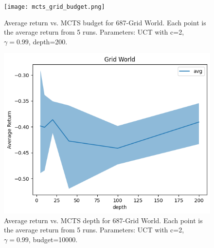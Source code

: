 \documentclass{article}
\begin{document}
\begin{figure}[!hb]
    \centering
    \begin{minipage}{0.48\textwidth}
        \centering
        \texttt{[image: mcts\_grid\_budget.png]}
        \caption{Average return vs. MCTS budget for 687-Grid World. Each point is the average return from 5 runs. Parameters: UCT with c=2, $\gamma=0.99$, depth=200.}
        \label{fig:4.1.1}
    \end{minipage}
    \hfill
    \begin{minipage}{0.48\textwidth}
        \centering
        \includegraphics[width=\linewidth]{mcts_grid_depth.png}
        \caption{ Average return vs. MCTS depth for 687-Grid World. Each point is the average return from 5 runs. Parameters: UCT with c=2, $\gamma=0.99$, budget=10000.}
        \label{fig:4.1.2}
    \end{minipage}
\end{figure}
\end{document}
